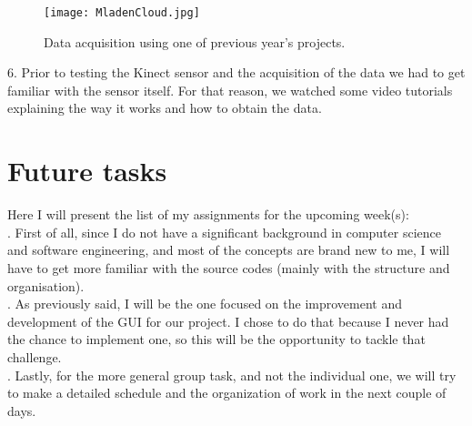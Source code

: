 \documentclass[aps,letterpaper,11pt]{revtex4}
\begin{document}
\begin{figure}[!htb]
  \texttt{[image: MladenCloud.jpg]}
  \caption{Data acquisition using one of previous year's projects.}
  \label{fig:MladenCloud}
\end{figure}

6. Prior to testing the Kinect sensor and the acquisition of the data we had to get familiar with the sensor itself. For that reason, we watched some video tutorials explaining the way it works and how to obtain the data.\\
\section {Future tasks}
Here I will present the list of my assignments for the upcoming week(s):\\
. First of all, since I do not have a significant background in computer science and software engineering, and most of the concepts are brand new to me, I will have to get more familiar with the source codes (mainly with the structure and organisation).\\
. As previously said, I will be the one focused on the improvement and development of the GUI for our project. I chose to do that because I never had the chance to implement one, so this will be the opportunity to tackle that challenge.\\
. Lastly, for the more general group task, and not the individual one, we will try to make a detailed schedule and the organization of work in the next couple of days.  
\end{document}
